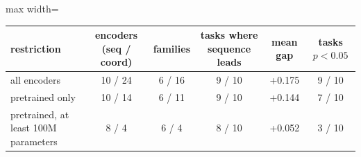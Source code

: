 \begin{adjustbox}{max width=\linewidth}
\begin{tabular}{lccccc}
\toprule
\rowcolor{CompassLavender!32}
restriction & encoders (seq / coord) & families & tasks where sequence leads & mean gap & tasks $p<0.05$ \\
\midrule
all encoders & 10 / 24 & 6 / 16 & 9 / 10 & +0.175 & 9 / 10 \\
pretrained only & 10 / 14 & 6 / 11 & 9 / 10 & +0.144 & 7 / 10 \\
pretrained, at least 100M parameters & 8 / 4 & 6 / 4 & 8 / 10 & +0.052 & 3 / 10 \\
\bottomrule
\end{tabular}
\end{adjustbox}
